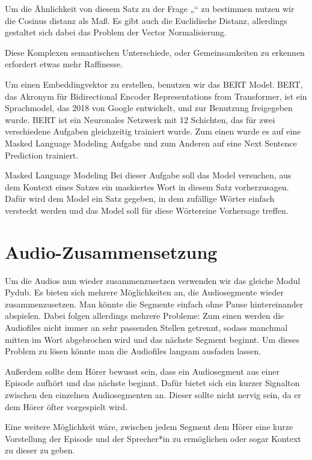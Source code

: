 Um die Ähnlichkeit von diesem Satz zu der Frage „“ zu bestimmen nutzen wir die Cosinus distanz als Maß. Es gibt auch die Euclidische Distanz, allerdings gestaltet sich dabei das Problem der Vector Normalisierung.


Diese Komplexen semantischen Unterschiede, oder Gemeinsamkeiten zu erkennen erfordert etwas mehr Raffinesse. 

Um einen Embeddingvektor zu erstellen, benutzen wir das BERT Model. BERT, das Akronym für Bidirectional Encoder Representations from Transformer, ist ein Sprachmodel, das 2018 von Google entwickelt, und zur Benutzung freigegeben wurde. BERT ist ein Neuronales Netzwerk mit 12 Schichten, das für zwei verschiedene Aufgaben gleichzeitig trainiert wurde. Zum einen wurde es auf eine Masked Language Modeling Aufgabe und zum Anderen auf eine Next Sentence Prediction trainiert. 

Masked Language Modeling
Bei dieser Aufgabe soll das Model versuchen, aus dem Kontext eines Satzes ein maskiertes Wort in diesem Satz vorherzusagen. Dafür wird dem Model ein Satz gegeben, in dem zufällige Wörter einfach versteckt werden und das Model soll für diese Wörtereine Vorhersage treffen. 


\section{Audio-Zusammensetzung}


Um die Audios nun wieder zusammenzusetzen verwenden wir das gleiche Modul Pydub. Es bieten sich mehrere Möglichkeiten an, die Audiosegmente wieder zusammenzusetzen. Man könnte die Segmente einfach ohne Pause hintereinander abspielen. Dabei folgen allerdings mehrere Probleme: 
Zum einen werden die Audiofiles nicht immer an sehr passenden Stellen getrennt, sodass manchmal mitten im Wort abgebrochen wird und das nächste Segment beginnt. 
Um dieses Problem zu lösen könnte man die Audiofiles langsam ausfaden lassen.

Außerdem sollte dem Hörer bewusst sein, dass ein Audiosegment aus einer Episode aufhört und das nächste beginnt. Dafür bietet sich ein kurzer Signalton zwischen den einzelnen Audiosegmenten an. Dieser sollte nicht nervig sein, da er dem Hörer öfter vorgespielt wird. 

Eine weitere Möglichkeit wäre, zwischen jedem Segment dem Hörer eine kurze Vorstellung der Episode und der Sprecher*in zu ermöglichen oder sogar Kontext zu dieser zu geben. 



